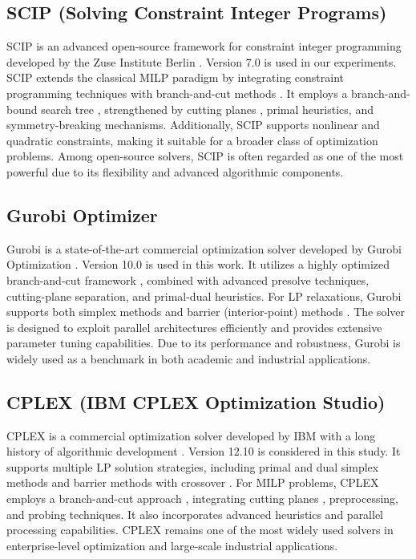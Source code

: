 \subsection{SCIP (Solving Constraint Integer Programs)}

SCIP is an advanced open-source framework for constraint integer programming developed by the Zuse Institute Berlin \cite{scip2023}. Version 7.0 is used in our experiments. SCIP extends the classical MILP paradigm by integrating constraint programming techniques with branch-and-cut methods \cite{nemhauser1988integer}. It employs a branch-and-bound search tree \cite{land1960automatic}, strengthened by cutting planes \cite{gomory1958outline}, primal heuristics, and symmetry-breaking mechanisms. Additionally, SCIP supports nonlinear and quadratic constraints, making it suitable for a broader class of optimization problems. Among open-source solvers, SCIP is often regarded as one of the most powerful due to its flexibility and advanced algorithmic components.

\subsection{Gurobi Optimizer}

Gurobi is a state-of-the-art commercial optimization solver developed by Gurobi Optimization \cite{gurobi2024}. Version 10.0 is used in this work. It utilizes a highly optimized branch-and-cut framework \cite{nemhauser1988integer,wolsey1998integer}, combined with advanced presolve techniques, cutting-plane separation, and primal-dual heuristics. For LP relaxations, Gurobi supports both simplex methods \cite{dantzig1963linear} and barrier (interior-point) methods \cite{karmarkar1984interior}. The solver is designed to exploit parallel architectures efficiently and provides extensive parameter tuning capabilities. Due to its performance and robustness, Gurobi is widely used as a benchmark in both academic and industrial applications.

\subsection{CPLEX (IBM CPLEX Optimization Studio)}

CPLEX is a commercial optimization solver developed by IBM with a long history of algorithmic development \cite{cplex2024}. Version 12.10 is considered in this study. It supports multiple LP solution strategies, including primal and dual simplex methods \cite{dantzig1963linear} and barrier methods with crossover \cite{karmarkar1984interior}. For MILP problems, CPLEX employs a branch-and-cut approach \cite{nemhauser1988integer}, integrating cutting planes \cite{gomory1958outline}, preprocessing, and probing techniques. It also incorporates advanced heuristics and parallel processing capabilities. CPLEX remains one of the most widely used solvers in enterprise-level optimization and large-scale industrial applications.

